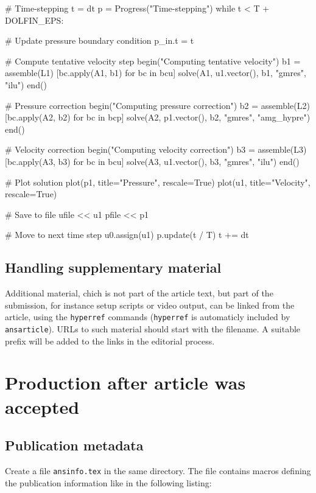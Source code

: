 \documentclass{ansarticle}
\begin{document}
\begin{python}
# Time-stepping
t = dt
p = Progress("Time-stepping")
while t < T + DOLFIN_EPS:

    # Update pressure boundary condition
    p_in.t = t

    # Compute tentative velocity step
    begin("Computing tentative velocity")
    b1 = assemble(L1)
    [bc.apply(A1, b1) for bc in bcu]
    solve(A1, u1.vector(), b1, "gmres", "ilu")
    end()

    # Pressure correction
    begin("Computing pressure correction")
    b2 = assemble(L2)
    [bc.apply(A2, b2) for bc in bcp]
    solve(A2, p1.vector(), b2, "gmres", "amg_hypre")
    end()

    # Velocity correction
    begin("Computing velocity correction")
    b3 = assemble(L3)
    [bc.apply(A3, b3) for bc in bcu]
    solve(A3, u1.vector(), b3, "gmres", "ilu")
    end()

    # Plot solution
    plot(p1, title="Pressure", rescale=True)
    plot(u1, title="Velocity", rescale=True)

    # Save to file
    ufile << u1
    pfile << p1

    # Move to next time step
    u0.assign(u1)
    p.update(t / T)
    t += dt
\end{python}

\subsection{Handling supplementary material}

Additional material, chich is not part of the article text, but part
of the submission, for instance setup scripts or video output, can be
linked from the article, using the \texttt{hyperref} commands
(\texttt{hyperref} is automaticly included by
\texttt{ansarticle}). URLs to such material should start with the
filename. A suitable prefix will be added to the links in the
editorial process.

\section{Production after article was accepted}
\subsection{Publication metadata}

Create a file \texttt{ansinfo.tex} in the same directory. The file
contains macros defining the publication information like in the
following listing:
\end{document}

